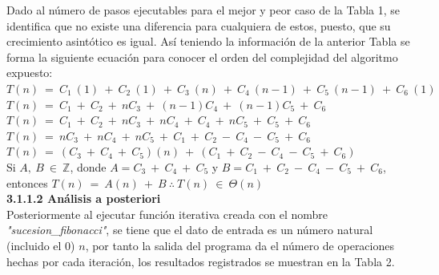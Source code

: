 \documentclass[12pt,twoside]{article}
\begin{document}
Dado al n\'umero de pasos ejecutables para el mejor y peor caso de la Tabla 1, se identifica que no existe una diferencia para cualquiera de estos, puesto, que su crecimiento asint\'otico es igual. As\'i teniendo la informaci\'on de la anterior Tabla se forma la siguiente ecuaci\'on para conocer el orden del complejidad del algoritmo expuesto:\\[0.4cm]
$T(n)~=~C_{1}~(1)~+~C_{2}~(1)~+~C_{3}~(n)~+~C_{4}~(n-1)~+~C_{5}~(n-1)~+~C_{6}~(1)$\\
$T(n)~=~C_{1}~+~C_{2}~+~nC_{3}~+~(n-1)C_{4}~+~(n-1)C_{5}~+~C_{6}$\\
$T(n)~=~C_{1}~+~C_{2}~+~nC_{3}~+~nC_{4}~+~C_{4}~+~nC_{5}~+~C_{5}~+~C_{6}$\\
$T(n)~=~nC_{3}~+~nC_{4}~+~nC_{5}~+~C_{1}~+~C_{2}~-~C_{4}~-~C_{5}~+~C_{6}$\\
$T(n)~=~(C_{3}~+~C_{4}~+~C_{5})(n)~+~(C_{1}~+~C_{2}~-~C_{4}~-~C_{5}~+~C_{6})$\\[0.2cm]
Si $A,~B~\in~\mathbb Z$, donde $A=C_{3}~+~C_{4}~+~C_{5}$ y $B=C_{1}~+~C_{2}~-~C_{4}~-~C_{5}~+~C_{6}$, entonces $T(n)~=~A(n)~+~B~ \therefore~T(n)~\in~\Theta(n)$\\[0.5cm]
\textbf{3.1.1.2 An\'alisis a posteriori}\\[0.4cm]
Posteriormente al ejecutar funci\'on iterativa creada con el nombre \textit{"sucesion\_fibonacci"}, se tiene que el dato de entrada es un n\'umero natural (incluido el 0) $n$,  por tanto la salida del programa da el n\'umero de operaciones hechas por cada iteraci\'on, los resultados registrados se muestran en la Tabla 2.
\end{document}
